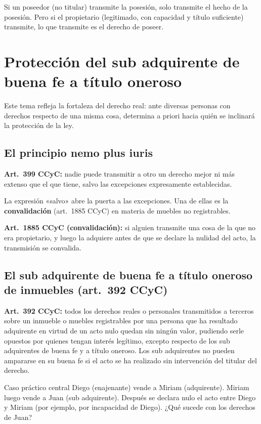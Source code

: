 \documentclass[12pt,oneside]{book}
\begin{document}
\begin{important}
Si un poseedor (no titular) transmite la posesión, solo transmite el hecho de la posesión. Pero si el propietario (legitimado, con capacidad y título suficiente) transmite, lo que transmite es el derecho de poseer.
\end{important}

\section{Protección del sub adquirente de buena fe a título oneroso}

Este tema refleja la fortaleza del derecho real: ante diversas personas con derechos respecto de una misma cosa, determina a priori hacia quién se inclinará la protección de la ley.

\subsection{El principio nemo plus iuris}

\textbf{Art.~399 CCyC:} nadie puede transmitir a otro un derecho mejor ni más extenso que el que tiene, salvo las excepciones expresamente establecidas.

La expresión «salvo» abre la puerta a las excepciones. Una de ellas es la \textbf{convalidación} (art.~1885 CCyC) en materia de muebles no registrables.

\textbf{Art.~1885 CCyC (convalidación):} si alguien transmite una cosa de la que no era propietario, y luego la adquiere antes de que se declare la nulidad del acto, la transmisión se convalida.

\subsection{El sub adquirente de buena fe a título oneroso de inmuebles (art.~392 CCyC)}

\textbf{Art.~392 CCyC:} todos los derechos reales o personales transmitidos a terceros sobre un inmueble o muebles registrables por una persona que ha resultado adquirente en virtud de un acto nulo quedan sin ningún valor, pudiendo serle opuestos por quienes tengan interés legítimo, excepto respecto de los sub adquirentes de buena fe y a título oneroso. Los sub adquirentes no pueden ampararse en su buena fe si el acto se ha realizado sin intervención del titular del derecho.

\begin{example}{Caso práctico central}
Diego (enajenante) vende a Miriam (adquirente). Miriam luego vende a Juan (sub adquirente). Después se declara nulo el acto entre Diego y Miriam (por ejemplo, por incapacidad de Diego). ¿Qué sucede con los derechos de Juan?
\end{example}
\end{document}
